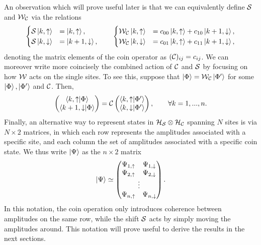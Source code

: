 An observation which will prove useful later  is that we can equivalently define ${\mathcal{S}}$ and ${\mathcal{W}}_{\mathcal{C}}$ via the relations
\begin{equation}
\begin{cases}
    {\mathcal{S}}\ket{k,\uparrow} &= \ket{k,\uparrow}, \\
    {\mathcal{S}}\ket{k,\downarrow} &= \ket{k+1, \downarrow},
\end{cases}
\qquad
\begin{cases}
    {\mathcal{W}}_{\mathcal{C}}\ket{k,\uparrow} &= c_{00} \ket{k,\uparrow} + c_{10} \ket{k+ 1,\downarrow}, \\
    {\mathcal{W}}_{\mathcal{C}}\ket{k,\downarrow} &= c_{01}\ket{k, \uparrow} + c_{11} \ket{k+1, \downarrow},
\end{cases}
\end{equation}
denoting the matrix elements of the coin operator as $({\mathcal{C}})_{ij}=c_{ij}$.
We can moreover write more coincisely the combined action of ${\mathcal{C}}$ and ${\mathcal{S}}$ by focusing on how ${\mathcal{W}}$ acts on the single sites.
To see this, suppose that $\ket{\Phi}={\mathcal{W}}_{\mathcal{C}}\ket{\Phi'}$ for some $\ket{\Phi},\ket{\Phi'}$ and ${\mathcal{C}}$.
Then,
\begin{equation}
    \begin{pmatrix}
        \braket{k,\uparrow}{\Phi} \\
        \braket{k + 1, \downarrow}{\Phi}
    \end{pmatrix} =
    {\mathcal{C}} \begin{pmatrix}
        \braket{k,\uparrow}{\Phi'} \\
        \braket{k,\downarrow}{\Phi'}
    \end{pmatrix},
    \qquad \forall k=1,...,n.
    \label{eq:qw_dynamics_on_single_positions}
\end{equation}
Finally, an alternative way to represent states in ${{\mathcal{H}}_{\mathcal{S}}}\otimes{{\mathcal{H}}_{\mathcal{C}}}$ spanning $N$ sites is via $N\times 2$ matrices, in which each row represents the amplitudes associated with a specific site, and each column the set of amplitudes associated with a specific coin state. 
We thus write $\ket\Psi$ as the $n\times2$ matrix
\begin{equation}
    \ket\Psi\simeq \begin{pmatrix}
        \Psi_{1,\uparrow} & \Psi_{1,\downarrow} \\
        \Psi_{2,\uparrow} & \Psi_{2,\downarrow} \\
        \multicolumn{2}{c}{\vdots} \\ 
        \Psi_{n,\uparrow} & \Psi_{n,\downarrow} \\
    \end{pmatrix}.
    \label{eq:qw_matrix_notation}
\end{equation}
In this notation, the coin operation only introduces coherence between amplitudes on the same row, while the shift ${\mathcal{S}}$ acts by simply moving the amplitudes around.
This notation will prove useful to derive the results in the next sections.


